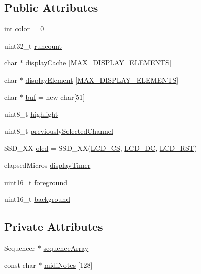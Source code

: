 \subsection*{Public Attributes}
\begin{DoxyCompactItemize}
\item 
int \hyperlink{class_display_module_ac071b7f3b2027d0e90b7d3031d61a99b}{color} = 0
\item 
uint32\+\_\+t \hyperlink{class_display_module_a5c8825161e8df40668c79145e5dace28}{runcount}
\item 
char $\ast$ \hyperlink{class_display_module_adf0d12d4d19fa7bff2fc66411e4255a2}{display\+Cache} \mbox{[}\hyperlink{display_module_8h_a6114392da1243b69a45b549bd4ddfd39}{M\+A\+X\+\_\+\+D\+I\+S\+P\+L\+A\+Y\+\_\+\+E\+L\+E\+M\+E\+N\+TS}\mbox{]}
\item 
char $\ast$ \hyperlink{class_display_module_a7af82afb24a27ab297fda02a9d1f0eb3}{display\+Element} \mbox{[}\hyperlink{display_module_8h_a6114392da1243b69a45b549bd4ddfd39}{M\+A\+X\+\_\+\+D\+I\+S\+P\+L\+A\+Y\+\_\+\+E\+L\+E\+M\+E\+N\+TS}\mbox{]}
\item 
char $\ast$ \hyperlink{class_display_module_a07c140067fde1f0cbc4061296179d69a}{buf} = new char\mbox{[}51\mbox{]}
\item 
uint8\+\_\+t \hyperlink{class_display_module_a33ee7436481d6285fb6c81166711fbce}{highlight}
\item 
uint8\+\_\+t \hyperlink{class_display_module_aaca9b1f6821215e5ebdc5bb6edb390b8}{previously\+Selected\+Channel}
\item 
S\+S\+D\+\_\+XX \hyperlink{class_display_module_abcfa732c08671b60dbf7f8d7e0d17e74}{oled} = S\+S\+D\+\_\+XX(\hyperlink{display_module_8h_a71d24cab0e16b054de228f29139f1b79}{L\+C\+D\+\_\+\+CS}, \hyperlink{display_module_8h_a1dc6c4886242abf4447d0da651125d5d}{L\+C\+D\+\_\+\+DC}, \hyperlink{display_module_8h_aec0f0ab242f1b58b1d017bc9ab4b898b}{L\+C\+D\+\_\+\+R\+ST})
\item 
elapsed\+Micros \hyperlink{class_display_module_a0c92fa8b35e030ef848db6207fe5067b}{display\+Timer}
\item 
uint16\+\_\+t \hyperlink{class_display_module_ab3b6b57d36f08a63a68641eefdb56446}{foreground}
\item 
uint16\+\_\+t \hyperlink{class_display_module_a7ebe1c30eb4c306a99a3129f6a165e2a}{background}
\end{DoxyCompactItemize}
\subsection*{Private Attributes}
\begin{DoxyCompactItemize}
\item 
Sequencer $\ast$ \hyperlink{class_display_module_a9eb0f63acb02bc366bdc36cf60efb799}{sequence\+Array}
\item 
const char $\ast$ \hyperlink{class_display_module_a76bde3057832542df04f4796ae917d48}{midi\+Notes} \mbox{[}128\mbox{]}
\end{DoxyCompactItemize}


